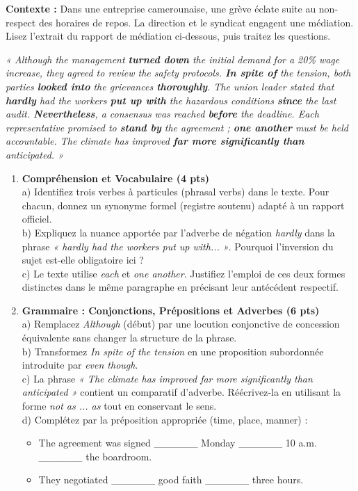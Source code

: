 \documentclass[11pt]{article}
\begin{document}
\begin{exercice}
\textbf{Contexte :} Dans une entreprise camerounaise, une grève éclate suite au non-respect des horaires de repos. La direction et le syndicat engagent une médiation. Lisez l'extrait du rapport de médiation ci-dessous, puis traitez les questions.

\textit{« Although the management \textbf{turned down} the initial demand for a 20\% wage increase, they agreed to review the safety protocols. \textbf{In spite of} the tension, both parties \textbf{looked into} the grievances \textbf{thoroughly}. The union leader stated that \textbf{hardly} had the workers \textbf{put up with} the hazardous conditions \textbf{since} the last audit. \textbf{Nevertheless}, a consensus was reached \textbf{before} the deadline. Each representative promised to \textbf{stand by} the agreement ; \textbf{one another} must be held accountable. The climate has improved \textbf{far more significantly than} anticipated. »}

\begin{enumerate}
    \item \textbf{Compréhension et Vocabulaire (4 pts)} \\
    a) Identifiez trois verbes à particules (phrasal verbs) dans le texte. Pour chacun, donnez un synonyme formel (registre soutenu) adapté à un rapport officiel. \\
    b) Expliquez la nuance apportée par l'adverbe de négation \textit{hardly} dans la phrase \textit{« hardly had the workers put up with... »}. Pourquoi l'inversion du sujet est-elle obligatoire ici ? \\
    c) Le texte utilise \textit{each} et \textit{one another}. Justifiez l'emploi de ces deux formes distinctes dans le même paragraphe en précisant leur antécédent respectif.

    \item \textbf{Grammaire : Conjonctions, Prépositions et Adverbes (6 pts)} \\
    a) Remplacez \textit{Although} (début) par une locution conjonctive de concession équivalente sans changer la structure de la phrase. \\
    b) Transformez \textit{In spite of the tension} en une proposition subordonnée introduite par \textit{even though}. \\
    c) La phrase \textit{« The climate has improved far more significantly than anticipated »} contient un comparatif d'adverbe. Réécrivez-la en utilisant la forme \textit{not as ... as} tout en conservant le sens. \\
    d) Complétez par la préposition appropriée (time, place, manner) : 
    \begin{itemize}
        \item The agreement was signed \_\_\_\_\_\_ Monday \_\_\_\_\_\_ 10 a.m. \_\_\_\_\_\_ the boardroom.
        \item They negotiated \_\_\_\_\_\_ good faith \_\_\_\_\_\_ three hours.
    \end{itemize}


\end{enumerate}
\end{exercice}
\end{document}
